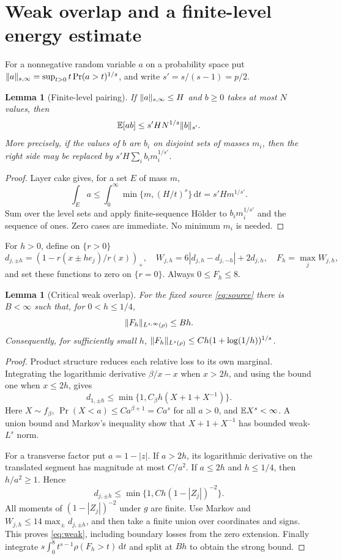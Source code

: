 \documentclass[11pt]{article}
\newtheorem{lemma}[theorem]{Lemma}
\theoremstyle{remark}\newtheorem{remark}[theorem]{Remark}
\newcommand{\dd}{\,\mathrm d}\newcommand{\Ptwo}{\mathcal P_2}
\begin{document}
\section{Weak overlap and a finite-level energy estimate}
For a nonnegative random variable $a$ on a probability space put
$\lVert a\rVert_{s,\infty}=\sup_{t>0}t\Pr(a>t)^{1/s}$, and write $s'=s/(s-1)=p/2$.
\begin{lemma}[Finite-level pairing]\label{lem:pair}
If $\lVert a\rVert_{s,\infty}\le H$ and $b\ge0$ takes at most $N$ values, then
\[
 \mathbb E[ab]\le s'H N^{1/s}\lVert b\rVert_{s'}.
\]
More precisely, if the values of $b$ are $b_i$ on disjoint sets of masses $m_i$, then the right side may be replaced by $s'H\sum_i b_i m_i^{1/s'}$.
\end{lemma}
\begin{proof}
Layer cake gives, for a set $E$ of mass $m$,
\[
 \int_E a\le\int_0^\infty\min\{m,(H/t)^s\}\dd t=s'Hm^{1/s'}.
\]
Sum over the level sets and apply finite-sequence H\"older to
$b_i m_i^{1/s'}$ and the sequence of ones. Zero cases are immediate. No minimum $m_i$ is needed.
\end{proof}

For $h>0$, define on $\{r>0\}$
\[
 d_{j,\pm h}=(1-r(x\pm he_j)/r(x))_+,\quad
 W_{j,h}=6|d_{j,h}-d_{j,-h}|+2d_{j,h},\quad F_h=\max_j W_{j,h},
\]
and set these functions to zero on $\{r=0\}$. Always $0\le F_h\le8$.
\begin{lemma}[Critical weak overlap]\label{lem:weak}
For the fixed source \eqref{eq:source} there is $B<\infty$ such that, for $0<h\le1/4$,
\begin{equation}\label{eq:weak}
 \lVert F_h\rVert_{L^{s,\infty}(\rho)}\le Bh.
\end{equation}
Consequently, for sufficiently small $h$,
$\lVert F_h\rVert_{L^s(\rho)}\le C h(1+\log(1/h))^{1/s}$.
\end{lemma}
\begin{proof}
Product structure reduces each relative loss to its own marginal. Integrating the logarithmic derivative $\beta/x-x$ when $x>2h$, and using the bound one when $x\le2h$, gives
\[
 d_{1,\pm h}\le\min\{1,C_\beta h(X+1+X^{-1})\}.
\]
Here $X\sim f_\beta$, $\Pr(X<a)\le C a^{\beta+1}=C a^s$ for all $a>0$, and $\mathbb E X^s<\infty$. A union bound and Markov's inequality show that $X+1+X^{-1}$ has bounded weak-$L^s$ norm.

For a transverse factor put $a=1-|z|$. If $a>2h$, its logarithmic derivative on the translated segment has magnitude at most $C/a^2$. If $a\le2h$ and $h\le1/4$, then $h/a^2\ge1$. Hence
\[
 d_{j,\pm h}\le\min\{1,Ch(1-|Z_j|)^{-2}\}.
\]
All moments of $(1-|Z_j|)^{-2}$ under $g$ are finite. Use Markov and
$W_{j,h}\le14\max_\pm d_{j,\pm h}$, and then take a finite union over coordinates and signs. This proves \eqref{eq:weak}, including boundary losses from the zero extension. Finally integrate
$s\int_0^8 t^{s-1}\rho(F_h>t)\dd t$ and split at $Bh$ to obtain the strong bound.
\end{proof}
\end{document}
